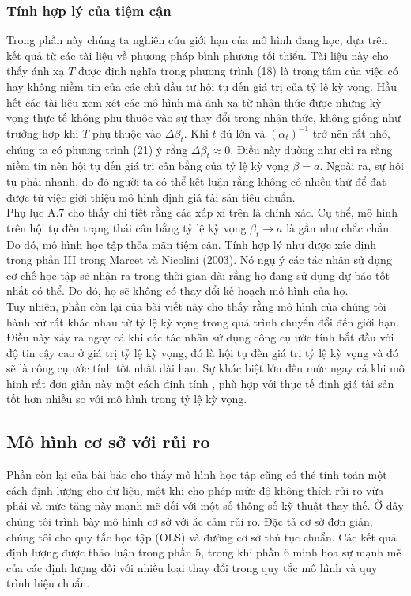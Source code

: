 \documentclass[10pt,a4paper]{article}
\begin{document}
	\subsubsection{Tính hợp lý của tiệm cận}
	Trong phần này chúng ta nghiên cứu giới hạn của mô hình đang học,
	dựa trên kết quả từ các tài liệu về phương pháp bình phương tối thiểu. Tài liệu này
	cho thấy ánh xạ $T$ được định nghĩa trong phương trình (18) là trọng tâm của việc có hay không niềm tin của các chủ đầu tư hội tụ đến giá trị của tỷ lệ kỳ vọng. Hầu hết các tài liệu xem xét các mô hình mà ánh xạ từ  nhận thức được những kỳ vọng thực tế không phụ thuộc vào sự thay đổi trong nhận thức, không giống như trường hợp khi $T$ phụ thuộc vào $\Delta\beta_t$. Khi $t$ đủ lớn và $(\alpha_t)^{-1}$ trở nên rất nhỏ, chúng ta có phương trình (21) ý rằng $\Delta\beta_t \approx 0$. Điều này dường như chỉ ra rằng niềm tin nên hội tụ đến giá trị cân bằng của tỷ lệ kỳ vọng $\beta=a$. 
	Ngoài ra, sự hội tụ phải nhanh, do đó người ta có thể kết luận rằng không có nhiều thứ để đạt được từ việc giới thiệu mô hình định giá tài sản tiêu chuẩn.\\
	
	Phụ lục A.7 cho thấy chi tiết rằng các xấp xỉ trên là chính xác. Cụ thể, mô hình trên  hội tụ đến trạng thái cân bằng tỷ lệ kỳ vọng $\beta_t \to a$ là gần như chắc chắn. Do đó, mô hình học tập thỏa mãn tiệm cận. Tính hợp lý như được xác định trong phần III trong Marcet và Nicolini (2003). Nó ngụ ý các tác nhân sử dụng cơ chế học tập sẽ nhận ra trong thời gian dài rằng họ đang sử dụng dự báo tốt nhất có thể. Do đó, họ sẽ không có  thay đổi kế hoạch mô hình của họ.\\
	Tuy nhiên, phần còn lại của bài viết này cho thấy rằng mô hình của chúng tôi hành xử rất khác nhau từ tỷ lệ kỳ vọng trong quá trình chuyển đổi đến giới hạn. Điều này xảy ra ngay cả khi các tác nhân sử dụng công cụ ước tính bắt đầu với độ tin cậy cao ở giá trị tỷ lệ kỳ vọng, đó là hội tụ đến giá trị tỷ lệ kỳ vọng và đó sẽ là công cụ ước tính tốt nhất dài hạn. Sự khác biệt lớn đến mức ngay cả khi mô hình rất đơn giản này một cách định tính
	, phù hợp với thực tế định giá tài sản tốt hơn nhiều so với mô hình trong tỷ lệ kỳ vọng.
	
	\subsection{Mô hình cơ sở với rủi ro}
	
	Phần còn lại của bài báo cho thấy mô hình học tập cũng có thể tính toán một cách định lượng cho dữ liệu, một khi cho phép mức độ không thích rủi ro vừa phải và mức tăng này mạnh mẽ đối với một số thông số kỹ thuật thay thế.
	Ở đây chúng tôi trình bày mô hình cơ sở với ác cảm rủi ro. Đặc tả cơ sở đơn giản, chúng tôi cho quy tắc học tập (OLS) và đường cơ sở thủ tục chuẩn. Các kết quả định lượng được thảo luận trong phần 5, trong khi phần 6 minh họa sự mạnh mẽ của các định lượng đối với nhiều loại thay đổi trong quy tắc mô hình và quy trình hiệu chuẩn.\\
\end{document}
